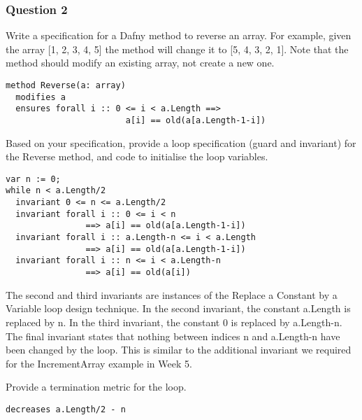 \subsubsection{Question 2}
Write a specification for a Dafny method to reverse an array. For example, given the array
[1, 2, 3, 4, 5] the method will change it to [5, 4, 3, 2, 1]. Note that the method should modify an
existing array, not create a new one.

\begin{verbatim}
method Reverse(a: array)
  modifies a
  ensures forall i :: 0 <= i < a.Length ==>
                        a[i] == old(a[a.Length-1-i])
\end{verbatim}


Based on your specification, provide a loop specification (guard and invariant) for the
Reverse method, and code to initialise the loop variables.

\begin{verbatim}
var n := 0;
while n < a.Length/2
  invariant 0 <= n <= a.Length/2
  invariant forall i :: 0 <= i < n
                ==> a[i] == old(a[a.Length-1-i])
  invariant forall i :: a.Length-n <= i < a.Length
                ==> a[i] == old(a[a.Length-1-i])
  invariant forall i :: n <= i < a.Length-n 
                ==> a[i] == old(a[i])
\end{verbatim}
The second and third invariants are instances of the Replace a Constant by a Variable loop
design technique. In the second invariant, the constant a.Length is replaced by n. In the third
invariant, the constant 0 is replaced by a.Length-n.
The final invariant states that nothing between indices n and a.Length-n have been changed by
the loop. This is similar to the additional invariant we required for the IncrementArray example
in Week 5.

Provide a termination metric for the loop.
\begin{verbatim}
decreases a.Length/2 - n
\end{verbatim}